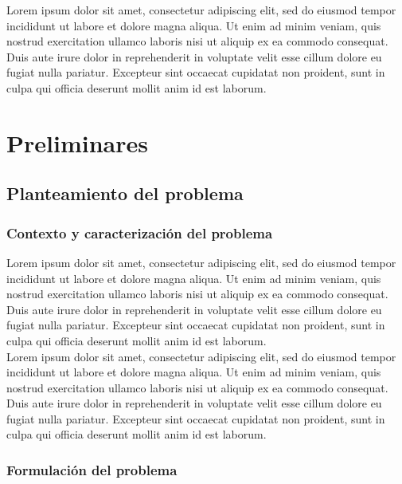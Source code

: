 \documentclass[11pt]{report} %
\begin{document}
Lorem ipsum dolor sit amet, consectetur adipiscing elit, sed do eiusmod tempor incididunt ut labore et dolore magna aliqua. Ut enim ad minim veniam, quis nostrud exercitation ullamco laboris nisi ut aliquip ex ea commodo consequat. Duis aute irure dolor in reprehenderit in voluptate velit esse cillum dolore eu fugiat nulla pariatur. Excepteur sint occaecat cupidatat non proident, sunt in culpa qui officia deserunt mollit anim id est laborum.


\chapter{Preliminares}

\section{Planteamiento del problema}

\subsection{Contexto y caracterización del problema}


Lorem ipsum dolor sit amet, consectetur adipiscing elit, sed do eiusmod tempor incididunt ut labore et dolore magna aliqua. Ut enim ad minim veniam, quis nostrud exercitation ullamco laboris nisi ut aliquip ex ea commodo consequat. Duis aute irure dolor in reprehenderit in voluptate velit esse cillum dolore eu fugiat nulla pariatur. Excepteur sint occaecat cupidatat non proident, sunt in culpa qui officia deserunt mollit anim id est laborum.\\

Lorem ipsum dolor sit amet, consectetur adipiscing elit, sed do eiusmod tempor incididunt ut labore et dolore magna aliqua. Ut enim ad minim veniam, quis nostrud exercitation ullamco laboris nisi ut aliquip ex ea commodo consequat. Duis aute irure dolor in reprehenderit in voluptate velit esse cillum dolore eu fugiat nulla pariatur. Excepteur sint occaecat cupidatat non proident, sunt in culpa qui officia deserunt mollit anim id est laborum.



\subsection{Formulación del problema}
\end{document}
